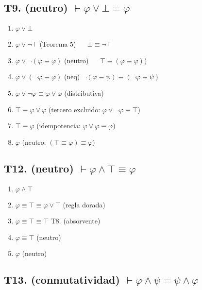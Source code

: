 \newpage


\subsection{T9. (neutro) $\vdash \varphi \lor \bot \equiv \varphi$}

\begin{enumerate}
    \item $\varphi \lor \bot$
    \item $\varphi \lor \neg \top$ \hfill (Teorema 5) ~~ $\bot \equiv \neg \top$
    \item $\varphi \lor \neg (\varphi \equiv \varphi)$ \hfill (neutro) ~~ $\top \equiv (\varphi \equiv \varphi)$)
    \item $\varphi \lor (\neg \varphi \equiv \varphi)$ \hfill (neq) $\neg (\varphi \equiv \psi) \equiv (\neg\varphi \equiv \psi)$
    \item $\varphi \lor \neg \varphi \equiv \varphi \lor \varphi$ \hfill (distributiva)
    \item $\top \equiv \varphi \lor \varphi$ \hfill (tercero excluido: $\varphi \lor \neg \varphi \equiv \top$)
    \item $\top \equiv \varphi$ \hfill (idempotencia: $\varphi \lor \varphi \equiv \varphi$)
    \item $\varphi$ \hfill (neutro: $(\top \equiv \varphi) \equiv \varphi$)
\end{enumerate}

\subsection{T12. (neutro) $\vdash \varphi \land \top \equiv \varphi$}

\begin{enumerate}
    \item $\varphi \land \top$
    \item $\varphi \equiv \top \equiv \varphi \lor \top$ \hfill (regla dorada)
    \item $\varphi \equiv \top \equiv \top$ \hfill T8. (absorvente)
    \item $\varphi \equiv \top$ \hfill (neutro)
    \item $\varphi$ \hfill (neutro)
\end{enumerate}

\subsection{T13. (conmutatividad) $\vdash \varphi \land \psi \equiv \psi \land \varphi$}

